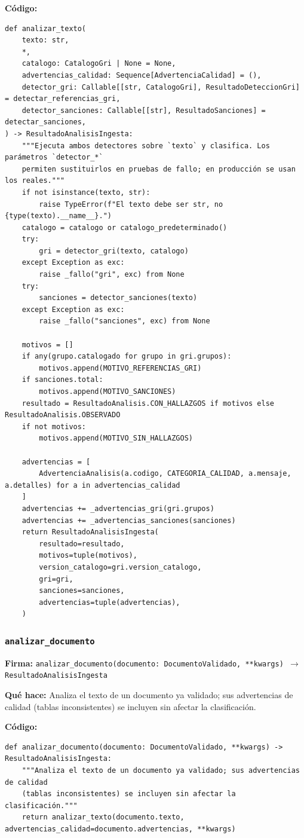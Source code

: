 \documentclass[11pt,a4paper]{article}
\begin{document}
\textbf{Código:}
\begin{lstlisting}
def analizar_texto(
    texto: str,
    *,
    catalogo: CatalogoGri | None = None,
    advertencias_calidad: Sequence[AdvertenciaCalidad] = (),
    detector_gri: Callable[[str, CatalogoGri], ResultadoDeteccionGri] = detectar_referencias_gri,
    detector_sanciones: Callable[[str], ResultadoSanciones] = detectar_sanciones,
) -> ResultadoAnalisisIngesta:
    """Ejecuta ambos detectores sobre `texto` y clasifica. Los parámetros `detector_*`
    permiten sustituirlos en pruebas de fallo; en producción se usan los reales."""
    if not isinstance(texto, str):
        raise TypeError(f"El texto debe ser str, no {type(texto).__name__}.")
    catalogo = catalogo or catalogo_predeterminado()
    try:
        gri = detector_gri(texto, catalogo)
    except Exception as exc:
        raise _fallo("gri", exc) from None
    try:
        sanciones = detector_sanciones(texto)
    except Exception as exc:
        raise _fallo("sanciones", exc) from None

    motivos = []
    if any(grupo.catalogado for grupo in gri.grupos):
        motivos.append(MOTIVO_REFERENCIAS_GRI)
    if sanciones.total:
        motivos.append(MOTIVO_SANCIONES)
    resultado = ResultadoAnalisis.CON_HALLAZGOS if motivos else ResultadoAnalisis.OBSERVADO
    if not motivos:
        motivos.append(MOTIVO_SIN_HALLAZGOS)

    advertencias = [
        AdvertenciaAnalisis(a.codigo, CATEGORIA_CALIDAD, a.mensaje, a.detalles) for a in advertencias_calidad
    ]
    advertencias += _advertencias_gri(gri.grupos)
    advertencias += _advertencias_sanciones(sanciones)
    return ResultadoAnalisisIngesta(
        resultado=resultado,
        motivos=tuple(motivos),
        version_catalogo=gri.version_catalogo,
        gri=gri,
        sanciones=sanciones,
        advertencias=tuple(advertencias),
    )
\end{lstlisting}

\subsubsection*{\texttt{analizar\_documento}}
\textbf{Firma:} \texttt{analizar\_documento(documento: DocumentoValidado, **kwargs) $\rightarrow$ ResultadoAnalisisIngesta}

\textbf{Qué hace:} Analiza el texto de un documento ya validado; sus advertencias de calidad
(tablas inconsistentes) se incluyen sin afectar la clasificación.

\textbf{Código:}
\begin{lstlisting}
def analizar_documento(documento: DocumentoValidado, **kwargs) -> ResultadoAnalisisIngesta:
    """Analiza el texto de un documento ya validado; sus advertencias de calidad
    (tablas inconsistentes) se incluyen sin afectar la clasificación."""
    return analizar_texto(documento.texto, advertencias_calidad=documento.advertencias, **kwargs)
\end{lstlisting}
\end{document}
